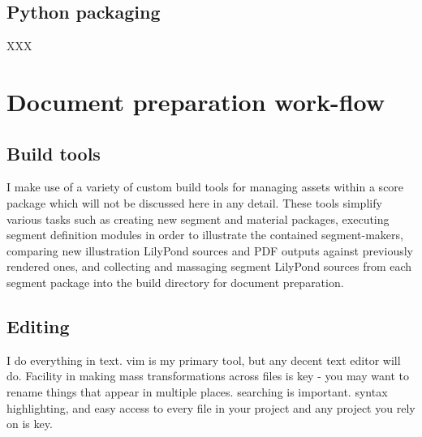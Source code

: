 \subsection{Python packaging}

XXX

\begin{singlespacing}
\vspace{-0.5\baselineskip}
\end{singlespacing}

\section{Document preparation work-flow}

\subsection{Build tools}

I make use of a variety of custom build tools for managing assets within a
score package which will not be discussed here in any detail. These tools
simplify various tasks such as creating new segment and material packages,
executing segment definition modules in order to illustrate the contained
segment-makers, comparing new illustration LilyPond sources and PDF outputs
against previously rendered ones, and collecting and massaging segment LilyPond
sources from each segment package into the build directory for document
preparation.

\subsection{Editing}

I do everything in text. vim is my primary tool, but any decent text editor
will do. Facility in making mass transformations across files is key - you may
want to rename things that appear in multiple places. searching is important.
syntax highlighting, and easy access to every file in your project and any
project you rely on is key.

